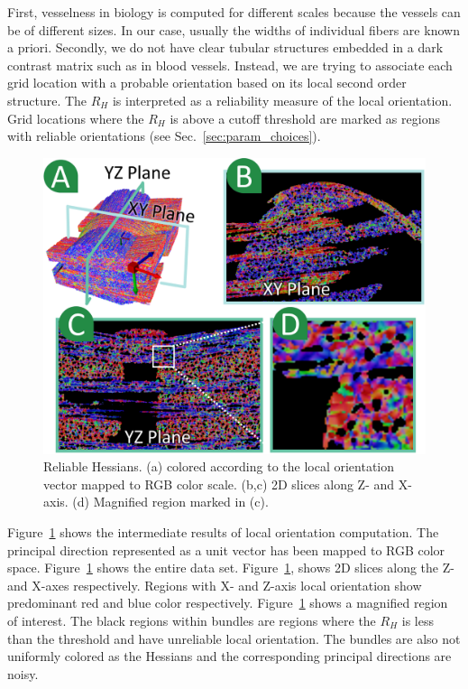 First, vesselness in biology is computed for different scales because the vessels can be of different sizes. In our case, usually the widths of individual fibers are known a priori.
Secondly, we do not have clear tubular structures embedded in a dark contrast matrix such as in blood vessels.
Instead, we are trying to associate each grid location  with a probable orientation based on its local second order structure. The $R_{H}$ is interpreted as a reliability measure of the local orientation.
Grid locations where the $R_{H}$ is above a cutoff threshold are marked as regions with reliable orientations (see Sec.~\ref{sec:param_choices}).

\begin{figure}[tb]
\centering
\includegraphics[width=\linewidth]{images/reliable_hessian2row.eps}
\caption{Reliable Hessians. (a) \mt colored according to the local orientation vector mapped to RGB color scale. (b,c) 2D slices along Z- and X- axis. (d) Magnified region marked in (c).}
\label{fig:reliable_hessian}
\vskip-0.2cm
\end{figure}
Figure~\ref{fig:reliable_hessian} shows the intermediate results of local orientation computation.
The principal direction represented as a unit vector has been mapped to RGB color space.
Figure~\ref{fig:reliable_hessian} shows the entire data set. 
Figure~\ref{fig:reliable_hessian}, shows 2D slices along the Z- and X-axes respectively. Regions with X- and Z-axis local orientation show predominant red and blue color respectively.   Figure~\ref{fig:reliable_hessian} shows a magnified region of interest. The black regions within bundles are regions where the $R_H$ is less than the threshold and have unreliable local orientation. The bundles are also not uniformly colored as the Hessians and the corresponding principal directions are noisy.

